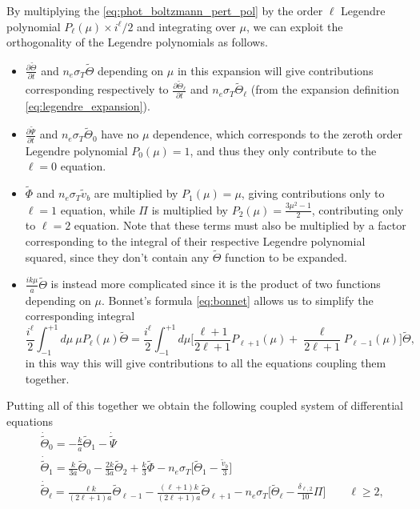 By multiplying the \eqref{eq:phot_boltzmann_pert_pol} by the order $\ell$ Legendre polynomial $P_\ell(\mu)\times i^\ell/2$ and integrating over $\mu$, we can exploit the orthogonality of the Legendre polynomials as follows.
\begin{itemize}
    \item $\frac{\partial \tilde\Theta}{\partial t} $ and $n_e\sigma_T\tilde{\Theta}$ depending on $\mu$ in this expansion will give contributions corresponding respectively to $\frac{\partial \tilde\Theta_\ell}{\partial t} $ and $n_e\sigma_T\tilde{\Theta}_\ell$ (from the expansion definition \eqref{eq:legendre_expansion}).
    \item $\frac{\partial\tilde\Psi}{\partial t}$ and $n_e\sigma_T\tilde\Theta_0$ have no $\mu$ dependence, which corresponds to the zeroth order Legendre polynomial $P_0(\mu)=1$, and thus they only contribute to the $\ell=0$ equation.
    \item $\tilde\Phi$ and $n_e\sigma_T\tilde v_b$ are multiplied by $P_1(\mu)=\mu$, giving contributions only to $\ell=1$ equation, while $\Pi$ is multiplied by $P_2(\mu)=\frac{3\mu^2-1}{2}$, contributing only to $\ell=2$ equation. Note that these terms must also be multiplied by a factor corresponding to the integral of their respective Legendre polynomial squared, since they don't contain any $\tilde\Theta$ function to be expanded.
    \item $\frac{ik\mu}{a}\tilde\Theta$ is instead more complicated since it is the product of two functions depending on $\mu$. Bonnet's formula \eqref{eq:bonnet} allows us to simplify the corresponding integral 
    $$\frac{i^\ell}{2}\int_{-1}^{+1}d\mu\ \mu P_\ell(\mu)\tilde\Theta=\frac{i^\ell}{2}\int_{-1}^{+1}d\mu \bigg[\frac{\ell+1}{2\ell+1}P_{\ell+1}(\mu)+\frac{\ell}{2\ell+1}P_{\ell-1}(\mu)\bigg]\tilde\Theta,$$
    in this way this will give contributions to all the equations coupling them together.
\end{itemize}
Putting all of this together we obtain the following coupled system of differential equations
\begin{subequations}\label{eq:multipole_boltzmann_photons}
    \begin{align}
           &\dot{\tilde{\Theta}}_0=-\frac{k}{a}\tilde{\Theta}_1-\dot{\tilde\Psi}\label{eq:multipole_boltzmann_photons_0}\\
            &\dot{\tilde{\Theta}}_1=\frac{k}{3a}\tilde\Theta_0-\frac{2k}{3a}\tilde\Theta_2+\frac{k}{3}\tilde\Phi-n_e\sigma_T\bigg[\tilde\Theta_1-\frac{\tilde v_b}{3}\bigg]\label{eq:multipole_boltzmann_photons_2}\\
            &\dot{\tilde{\Theta}}_\ell=\frac{\ell k}{(2\ell+1)a}\tilde\Theta_{\ell-1}-\frac{(\ell+1)k}{(2\ell+1)a}\tilde\Theta_{\ell+1}-n_e\sigma_T\bigg[\tilde\Theta_\ell-\frac{\delta_{\ell,2}}{10}\Pi\bigg]\qquad \ell\geq 2,\label{eq:multipole_boltzmann_photons_3}
        \end{align}
\end{subequations}

